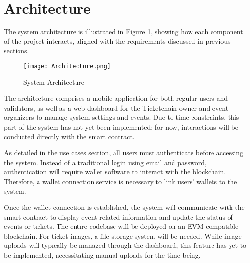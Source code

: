 \section{Architecture}
\label{sec:architecture}

The system architecture is illustrated in Figure \ref{fig:architecture},
showing how each component of the project interacts, aligned with the
requirements discussed in previous sections.

\begin{figure}[H]
    \centering
    \texttt{[image: Architecture.png]}
    \caption{System Architecture}
    \label{fig:architecture}
\end{figure}

The architecture comprises a mobile application for both regular users and
validators, as well as a web dashboard for the Ticketchain owner and event
organizers to manage system settings and events. Due to time constraints, this
part of the system has not yet been implemented; for now, interactions will be
conducted directly with the smart contract.

As detailed in the use cases section, all users must authenticate before
accessing the system. Instead of a traditional login using email and password,
authentication will require wallet software to interact with the blockchain.
Therefore, a wallet connection service is necessary to link users' wallets to
the system.

Once the wallet connection is established, the system will communicate with the
smart contract to display event-related information and update the status of
events or tickets. The entire codebase will be deployed on an EVM-compatible
blockchain. For ticket images, a file storage system will be needed. While
image uploads will typically be managed through the dashboard, this feature has
yet to be implemented, necessitating manual uploads for the time being.
